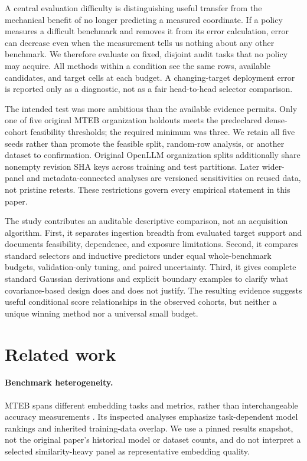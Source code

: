 \documentclass{article}
\begin{document}
A central evaluation difficulty is distinguishing useful transfer from the mechanical benefit of no longer predicting a measured coordinate. If a policy measures a difficult benchmark and removes it from its error calculation, error can decrease even when the measurement tells us nothing about any other benchmark. We therefore evaluate on fixed, disjoint audit tasks that no policy may acquire. All methods within a condition see the same rows, available candidates, and target cells at each budget. A changing-target deployment error is reported only as a diagnostic, not as a fair head-to-head selector comparison.

The intended test was more ambitious than the available evidence permits. Only one of five original MTEB organization holdouts meets the predeclared dense-cohort feasibility thresholds; the required minimum was three. We retain all five seeds rather than promote the feasible split, random-row analysis, or another dataset to confirmation. Original OpenLLM organization splits additionally share nonempty revision SHA keys across training and test partitions. Later wider-panel and metadata-connected analyses are versioned sensitivities on reused data, not pristine retests. These restrictions govern every empirical statement in this paper.

The study contributes an auditable descriptive comparison, not an acquisition algorithm. First, it separates ingestion breadth from evaluated target support and documents feasibility, dependence, and exposure limitations. Second, it compares standard selectors and inductive predictors under equal whole-benchmark budgets, validation-only tuning, and paired uncertainty. Third, it gives complete standard Gaussian derivations and explicit boundary examples to clarify what covariance-based design does and does not justify. The resulting evidence suggests useful conditional score relationships in the observed cohorts, but neither a unique winning method nor a universal small budget.

\section{Related work}\label{sec:related}
\paragraph{Benchmark heterogeneity.}
MTEB spans different embedding tasks and metrics, rather than interchangeable accuracy measurements \citep{muennighoff2022mteb}. Its inspected analyses emphasize task-dependent model rankings and inherited training-data overlap. We use a pinned results snapshot, not the original paper's historical model or dataset counts, and do not interpret a selected similarity-heavy panel as representative embedding quality.
\end{document}
